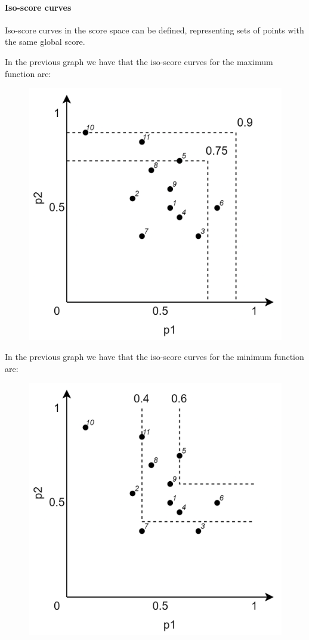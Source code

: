 \paragraph*{Iso-score curves}
Iso-score curves in the score space can be defined, representing sets of points with the same global score.
\begin{example}
    In the previous graph we have that the iso-score curves for the maximum function are: 
    \begin{figure}[H]
        \centering
        \includegraphics[width=0.35\linewidth]{images/iso.png}
    \end{figure}
    In the previous graph we have that the iso-score curves for the minimum function are: 
    \begin{figure}[H]
        \centering
        \includegraphics[width=0.35\linewidth]{images/isomin.png}
    \end{figure}
\end{example}

